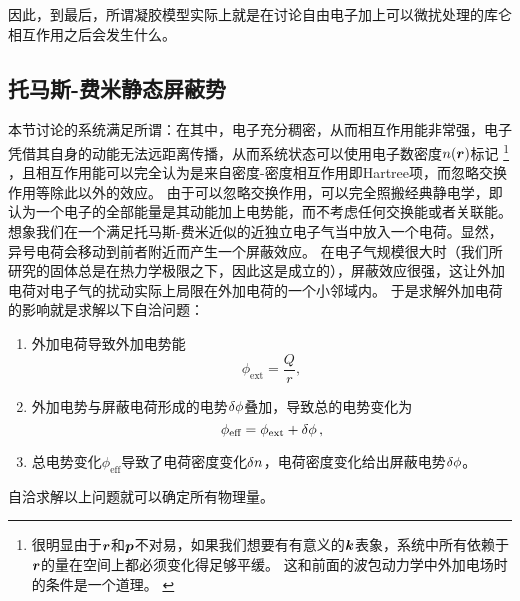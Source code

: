 因此，到最后，所谓凝胶模型实际上就是在讨论自由电子加上可以微扰处理的库仑相互作用之后会发生什么。

\subsection{托马斯-费米静态屏蔽势}\label{sec:ext-e}

本节讨论的系统满足所谓：在其中，电子充分稠密，从而相互作用能非常强，电子凭借其自身的动能无法远距离传播，从而系统状态可以使用电子数密度$n(\vb*{r})$标记%
\footnote{
    很明显由于$\vb*{r}$和$\vb*{p}$不对易，如果我们想要有有意义的$\vb*{k}$表象，系统中所有依赖于$\vb*{r}$的量在空间上都必须变化得足够平缓。
    这和前面的波包动力学中外加电场时的条件是一个道理。
    \label{note:smooth-electron-distribution}
}%
，且相互作用能可以完全认为是来自密度-密度相互作用即Hartree项，而忽略交换作用等除此以外的效应。
由于可以忽略交换作用，可以完全照搬经典静电学，即认为一个电子的全部能量是其动能加上电势能，而不考虑任何交换能或者关联能。
想象我们在一个满足托马斯-费米近似的近独立电子气当中放入一个电荷。显然，异号电荷会移动到前者附近而产生一个屏蔽效应。
在电子气规模很大时（我们所研究的固体总是在热力学极限之下，因此这是成立的），屏蔽效应很强，这让外加电荷对电子气的扰动实际上局限在外加电荷的一个小邻域内。
于是求解外加电荷的影响就是求解以下自洽问题：
\begin{enumerate}
    \item 外加电荷导致外加电势能
    \begin{equation}
        \phi_\text{ext} = \frac{Q}{r},
    \end{equation}
    \item 外加电势与屏蔽电荷形成的电势$\var{\phi}$叠加，导致总的电势变化为
    \begin{equation}
        \phi_\text{eff} = \phi_\text{ext} + \var{\phi},
    \end{equation}
    \item 总电势变化$\phi_\text{eff}$导致了电荷密度变化$\var{n}$，电荷密度变化给出屏蔽电势$\var{\phi}$。
\end{enumerate}
自洽求解以上问题就可以确定所有物理量。

